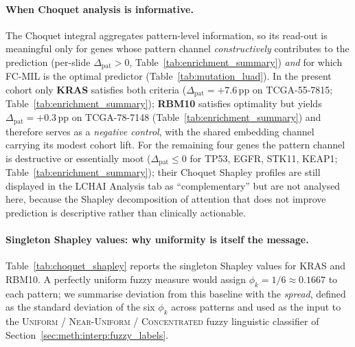 \paragraph{When Choquet analysis is informative.}
The Choquet integral aggregates pattern-level information, so its
read-out is meaningful only for genes whose pattern channel
\emph{constructively} contributes to the prediction (per-slide
$\Delta_{\mathrm{pat}} > 0$, Table~\ref{tab:enrichment_summary})
\emph{and} for which FC-MIL is the optimal predictor
(Table~\ref{tab:mutation_luad}).
In the present cohort only \textbf{KRAS} satisfies both criteria
($\Delta_{\mathrm{pat}} = +7.6$\,pp on TCGA-55-7815;
Table~\ref{tab:enrichment_summary});
\textbf{RBM10} satisfies optimality but yields
$\Delta_{\mathrm{pat}} = +0.3$\,pp on TCGA-78-7148
(Table~\ref{tab:enrichment_summary}) and therefore serves as a
\emph{negative control}, with the shared embedding channel
carrying its modest cohort lift.
For the remaining four genes the pattern channel is destructive or
essentially moot ($\Delta_{\mathrm{pat}} \leq 0$ for TP53, EGFR,
STK11, KEAP1; Table~\ref{tab:enrichment_summary}); their Choquet
Shapley profiles are still displayed in the LCHAI Analysis tab as
``complementary'' but are not analysed here, because the Shapley
decomposition of attention that does not improve prediction is
descriptive rather than clinically actionable.

\paragraph{Singleton Shapley values: why uniformity is itself the
message.}
Table~\ref{tab:choquet_shapley} reports the singleton Shapley values
for KRAS and RBM10.
A perfectly uniform fuzzy measure would assign $\phi_k = 1/6
\approx 0.1667$ to each pattern; we summarise deviation from this
baseline with the \emph{spread}, defined as the standard deviation
of the six $\phi_k$ across patterns and used as the input to the
\textsc{Uniform / Near-Uniform / Concentrated} fuzzy linguistic
classifier of Section~\ref{sec:meth:interp:fuzzy_labels}.

